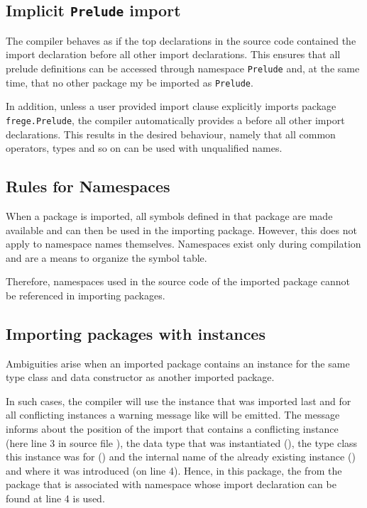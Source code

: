 \subsection{Implicit \texttt{Prelude} import}
The compiler behaves as if the top declarations in
the source code contained the import declaration
before all other import declarations.
This ensures that all prelude definitions can be accessed through
namespace \texttt{Prelude} and, at the same time, that no other package my be imported as {\tt Prelude}.

In addition, unless a user provided import clause explicitly imports package \texttt{frege.Prelude}, the
compiler automatically provides a
before all other import declarations.
This results
in the desired behaviour, namely that all common operators, types and
so on can be used with unqualified names.


\subsection{Rules for Namespaces}

When a package is imported, all symbols defined in that package are made
available and can then be used in the importing package.
However, this does not apply to namespace names themselves. 
Namespaces exist only during compilation and are a means to organize the symbol table.

Therefore, namespaces used in the source code of the imported package
cannot be referenced in importing packages.

\subsection{Importing packages with instances}

Ambiguities arise when an imported package contains an instance for
the same type class and data constructor as another imported package.

In such cases, the compiler will use the instance that was imported last and for all conflicting instances a warning message like
will be emitted.
The message informs about the position of the import that contains a conflicting instance (here line 3 in source file ), the data type that was instantiated (), the type class this instance was for () and the internal name of the already existing instance () and where it was introduced (on line 4). Hence, in this package, the  from the package that is associated with namespace  whose import declaration can be found at line 4 is used.
